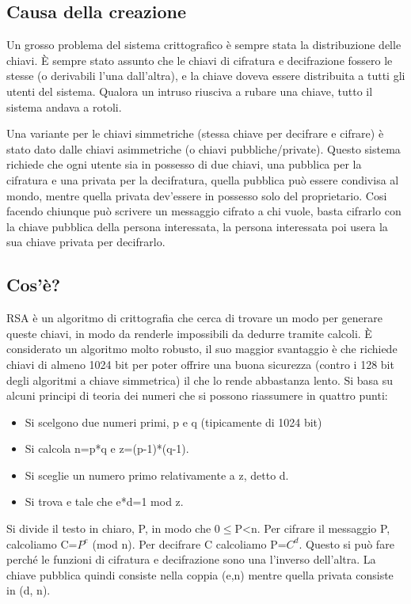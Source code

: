 \subsection{Causa della creazione}
Un grosso problema del sistema crittografico è sempre stata la distribuzione delle chiavi. 
È sempre stato assunto che le chiavi di cifratura e decifrazione fossero le stesse (o derivabili l'una dall'altra), e la chiave doveva essere distribuita a tutti gli utenti del sistema. Qualora un intruso riusciva a rubare una chiave, tutto il sistema andava a rotoli.

Una variante per le chiavi simmetriche (stessa chiave per decifrare e cifrare) è stato dato dalle chiavi asimmetriche (o chiavi pubbliche/private).
Questo sistema richiede che ogni utente sia in possesso di due chiavi, una pubblica per la cifratura e una privata per la decifratura, quella pubblica può essere condivisa al mondo, mentre quella privata dev'essere in possesso solo del proprietario.
Cosi facendo chiunque può scrivere un messaggio cifrato a chi vuole, basta cifrarlo con la chiave pubblica della persona interessata, la persona interessata poi usera la sua chiave privata per decifrarlo.
\subsection{Cos'è?}
RSA è un algoritmo di crittografia che cerca di trovare un modo per generare queste chiavi, in modo da renderle impossibili da dedurre tramite calcoli.
È considerato un algoritmo molto robusto, il suo maggior svantaggio è che richiede chiavi di almeno 1024 bit per poter offrire una buona sicurezza (contro i 128 bit degli algoritmi a chiave simmetrica) il che lo rende abbastanza lento.
Si basa su alcuni principi di teoria dei numeri che si possono riassumere in quattro punti:
\begin{itemize}
\item	Si scelgono due numeri primi, p e q (tipicamente di 1024 bit)
\item	Si calcola n=p*q    e   z=(p-1)*(q-1).
\item	Si sceglie un numero primo relativamente a z, detto d.
\item	Si trova e tale che e*d=1 mod z.
\end{itemize}

Si divide il testo in chiaro, P, in modo che 0$\leq$P<n. Per cifrare il messaggio P, calcoliamo C=$P^e$ (mod n). Per decifrare C calcoliamo P=$C^d$. Questo si può fare perché le funzioni di cifratura e decifrazione sono una l'inverso dell'altra.
La chiave pubblica quindi consiste nella coppia (e,n) mentre quella privata consiste in (d, n).

